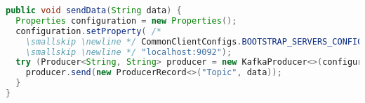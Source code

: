 
\begin{lstlisting}[language=Java, caption={Example of publishing data using Kafka Producer}, label={code:kafka:producer}]
public void sendData(String data) {
  Properties configuration = new Properties();
  configuration.setProperty( /*
    \smallskip \newline */ CommonClientConfigs.BOOTSTRAP_SERVERS_CONFIG, /*
    \smallskip \newline */ "localhost:9092");
  try (Producer<String, String> producer = new KafkaProducer<>(configuration)) {
    producer.send(new ProducerRecord<>("Topic", data));
  }
}
\end{lstlisting}
